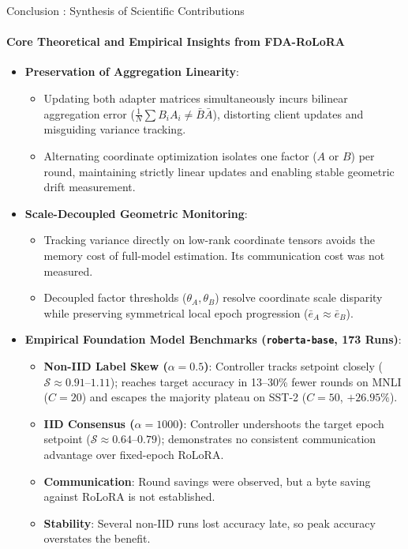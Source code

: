 \documentclass[aspectratio=169]{beamer}
\begin{document}
\begin{frame}{Conclusion : Synthesis of Scientific Contributions}
    \vspace{-0.3em}
    \framesubtitle{Core Theoretical and Empirical Insights from FDA-RoLoRA}
    \vspace{-0.3em}
    \scriptsize
    \begin{itemize}
        \item \textbf{Preservation of Aggregation Linearity}:
        \begin{itemize}
            \scriptsize
            \item Updating both adapter matrices simultaneously incurs bilinear aggregation error ($\frac{1}{N}\sum B_i A_i \neq \bar{B}\bar{A}$), distorting client updates and misguiding variance tracking.
            \item Alternating coordinate optimization isolates one factor ($A$ or $B$) per round, maintaining strictly linear updates and enabling stable geometric drift measurement.
        \end{itemize}
        \vspace{0.1em}
        \item \textbf{Scale-Decoupled Geometric Monitoring}:
        \begin{itemize}
            \scriptsize
            \item Tracking variance directly on low-rank coordinate tensors avoids the memory cost of full-model estimation. Its communication cost was not measured.
            \item Decoupled factor thresholds ($\theta_A, \theta_B$) resolve coordinate scale disparity while preserving symmetrical local epoch progression ($\bar{e}_A \approx \bar{e}_B$).
        \end{itemize}
        \vspace{0.1em}
        \item \textbf{Empirical Foundation Model Benchmarks (\texttt{roberta-base}, 173 Runs)}:
        \begin{itemize}
            \scriptsize
            \item \textbf{Non-IID Label Skew ($\alpha=0.5$)}: Controller tracks setpoint closely ($\mathcal{S} \approx 0.91\text{--}1.11$); reaches target accuracy in 13--30\% fewer rounds on MNLI ($C=20$) and escapes the majority plateau on SST-2 ($C=50$, $+26.95\%$).
            \item \textbf{IID Consensus ($\alpha=1000$)}: Controller undershoots the target epoch setpoint ($\mathcal{S} \approx 0.64\text{--}0.79$); demonstrates no consistent communication advantage over fixed-epoch RoLoRA.
            \item \textbf{Communication}: Round savings were observed, but a byte saving against RoLoRA is not established.
            \item \textbf{Stability}: Several non-IID runs lost accuracy late, so peak accuracy overstates the benefit.
        \end{itemize}
    \end{itemize}
\end{frame}
\end{document}
